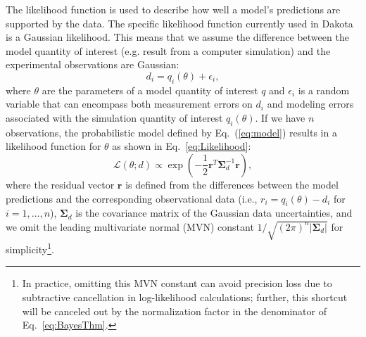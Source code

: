 The likelihood function is used to describe how well a model's
predictions are supported by the data.  
The specific likelihood function currently used in Dakota is a Gaussian
likelihood. This means that we assume the difference between the model quantity of interest
(e.g. result from a computer simulation) and the experimental observations are Gaussian:
\begin{equation}
d_i = q_i(\theta) + \epsilon_i, \label{eq:model}
\end{equation}
where $\theta$ are the parameters of a model quantity of interest $q$ and
$\epsilon_i$ is a random variable that can encompass both measurement
errors on $d_i$ and modeling errors associated with the simulation quantity of interest 
$q_i(\theta)$. %
If we have $n$ observations, the probabilistic model defined by 
Eq.~(\ref{eq:model}) results in a likelihood function for $\theta$ 
as shown in Eq.~\ref{eq:Likelihood}:
\begin{equation}
\mathcal{L}(\theta;d) \propto %
\exp \left(
-\frac{1}{2} \boldsymbol{r}^T \boldsymbol{\Sigma}_d^{-1} \boldsymbol{r} 
\right), \label{eq:Likelihood}
\end{equation}
where the residual vector $\boldsymbol{r}$ is defined from the
differences between the model predictions and the corresponding
observational data (i.e., $r_i = q_i(\theta) - d_i$ for $i = 1,\dots,n$),
$\boldsymbol{\Sigma}_d$ is the covariance matrix of the Gaussian data
uncertainties, and we omit the leading multivariate normal (MVN)
constant $1/\sqrt{(2\pi)^n |\boldsymbol{\Sigma}_d|}$ for 
simplicity\footnote{In practice, omitting this MVN constant can avoid 
  precision loss due to subtractive cancellation in log-likelihood 
  calculations; further, this shortcut will be canceled out by the 
  normalization factor in the denominator of Eq.~\ref{eq:BayesThm}.}. 

